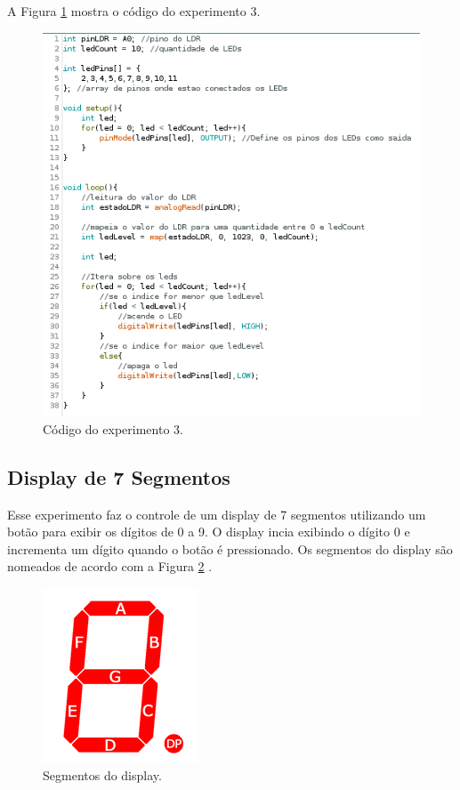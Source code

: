 \documentclass[12pt]{article}
\begin{document}
	A Figura \ref{codigoExp3} mostra o código do experimento 3.

	\begin{figure}[h!]
		\centering
		\includegraphics[scale=0.39]{Imagens/Experimentos/3-LDR-LEDGraph/codigo.png}
		\caption{Código do experimento 3.}
		\label{codigoExp3}
	\end{figure}

\subsection{Display de 7 Segmentos}
	Esse experimento faz o controle de um display de 7 segmentos utilizando um botão para exibir os dígitos de 0 a 9. O display incia exibindo o dígito 0 e incrementa um dígito quando o botão é pressionado. Os segmentos do display são nomeados de acordo com a Figura \ref{figSegmentosDisplay} \cite{siteDisplay7}.

	\begin{figure}[h!]
		\centering
		\includegraphics[scale=0.5]{Imagens/Experimentos/4-Display7Seg/7segmentos.png}
		\caption{Segmentos do display.}
		\label{figSegmentosDisplay}
	\end{figure}
\end{document}

